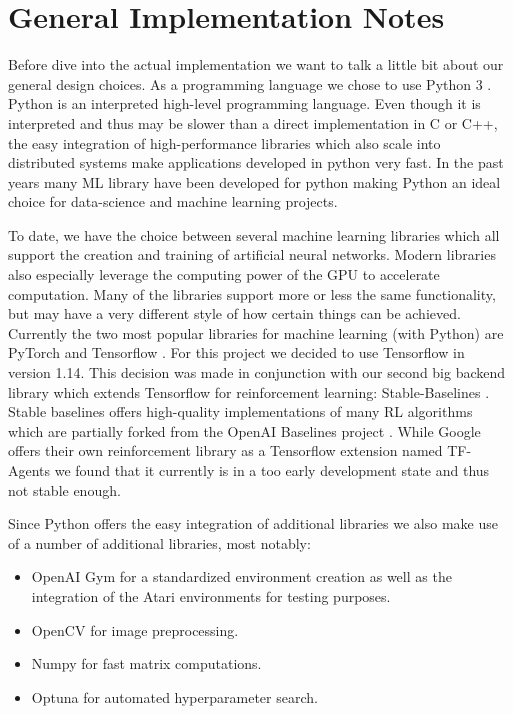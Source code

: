 \section{General Implementation Notes} \label{sec:ImplementationNotes}
Before dive into the actual implementation we want to talk a little bit about our general design choices. As a programming language we chose to use Python 3 \cite{van2011python, pythonWebsite}. Python is an interpreted high-level programming language. Even though it is interpreted and thus may be slower than a direct implementation in C or C++, the easy integration of high-performance libraries which also scale into distributed systems make applications developed in python very fast. In the past years many ML library have been developed for python making Python an ideal choice for data-science and machine learning projects.

To date, we have the choice between several machine learning libraries which all support the creation and training of artificial neural networks. Modern libraries also especially leverage the computing power of the GPU to accelerate computation. Many of the libraries support more or less the same functionality, but may have a very different style of how certain things can be achieved. Currently the two most popular libraries for machine learning (with Python) are PyTorch \cite{paszke2019pytorch} and Tensorflow \cite{abadi2016tensorflow}. For this project we decided to use Tensorflow in version 1.14. This decision was made in conjunction with our second big backend library which extends Tensorflow for reinforcement learning: Stable-Baselines \cite{stable-baselines}. Stable baselines offers high-quality implementations of many RL algorithms which are partially forked from the OpenAI Baselines project \cite{baselines}. While Google offers their own reinforcement library as a Tensorflow extension named TF-Agents \cite{TFAgents} we found that it currently is in a too early development state and thus not stable enough.

Since Python offers the easy integration of additional libraries we also make use of a number of additional libraries, most notably:
\begin{itemize}
    \item OpenAI Gym \cite{openAIgym} for a standardized environment creation as well as the integration of the Atari environments for testing purposes.
    \item OpenCV \cite{opencv_library} for image preprocessing.
    \item Numpy \cite{oliphant2006guide} for fast matrix computations.
    \item Optuna \cite{akiba2019optuna} for automated hyperparameter search.
\end{itemize}

